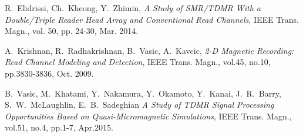 \begin{thebibliography}{1}
R.~Elidrissi, Ch.~Kheong, Y.~Zhimin,
\emph{A Study of SMR/TDMR With a Double/Triple Reader Head Array and Conventional Read Channels}, IEEE Trans. Magn., vol. 50, pp. 24-30, Mar. 2014.

A.~Krishnan, R.~Radhakrishnan, B.~Vasic, A.~Kavcic,
\emph{2-D Magnetic Recording: Read Channel Modeling and Detection}, IEEE Trans. Magn., vol.45, no.10, pp.3830-3836, Oct. 2009.

B.~Vasic, M.~Khatami, Y.~Nakamura, Y.~Okamoto, Y.~Kanai, J.~R.~Barry, S.~W.~McLaughlin, E.~B.~Sadeghian
\emph{A Study of TDMR Signal Processing Opportunities Based on Quasi-Micromagnetic Simulations}, IEEE Trans. Magn., vol.51, no.4, pp.1-7, Apr.2015.

\end{thebibliography}
